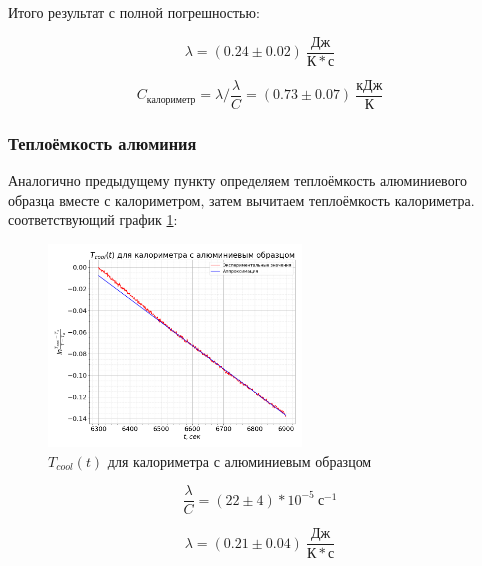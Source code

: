 \documentclass[a4paper, 12pt]{article}
\begin{document}
                Итого результат с полной погрешностью:

                \begin{equation*}
                    \lambda = (0.24 \pm 0.02)~\frac{Дж}{К*с}
                \end{equation*}

                \begin{equation*}
                    C_{калориметр} = \lambda / \frac{\lambda}{C} = (0.73 \pm 0.07)~\frac{кДж}{К}
                \end{equation*}

            \subsubsection{Теплоёмкость алюминия}

                Аналогично предыдущему пункту определяем теплоёмкость алюминиевого образца вместе с калориметром, затем вычитаем теплоёмкость калориметра. соответствующий график \ref{plot:T_cool_2}:

                \begin{figure}[ht]
                    \centering
                    \includegraphics[width=0.6\textwidth]{img/graph_cool_2.png}
                    \caption{$T_{cool}(t)$ для калориметра с алюминиевым образцом}
                    \label{plot:T_cool_2}
                \end{figure}

                \begin{equation*}
                    \frac{\lambda}{C} = (22 \pm 4)*10^{-5}~с^{-1}
                \end{equation*}

                \begin{equation*}
                    \lambda = (0.21 \pm 0.04)~\frac{Дж}{К*с}
                \end{equation*}
\end{document}
